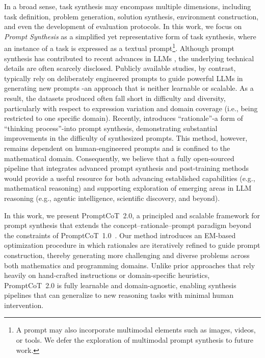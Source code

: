 In a broad sense, task synthesis may encompass multiple dimensions, including task definition, problem generation, solution synthesis, environment construction, and even the development of evaluation protocols. In this work, we focus on \textit{Prompt Synthesis} as a simplified yet representative form of task synthesis, where an instance of a task is expressed as a textual prompt\footnote{A prompt may also incorporate multimodal elements such as images, videos, or tools. We defer the exploration of multimodal prompt synthesis to future work.}. Although prompt synthesis has contributed to recent advances in LLMs \citep{yang2025qwen3,zeng2025glm,moonshot2025kimik2,adler2024nemotron}, the underlying technical details are often scarcely disclosed. Publicly available studies, by contrast, typically rely on deliberately engineered prompts to guide powerful LLMs in generating new prompts \citep{wang2023self,xu2024wizardlm,huang2025key,tang2024mathscale,yue2024mammoth2,li2024numinamath,luo2023wizardcoder,wei2023magicoder,huang2024opencoder,xu2025kodcode,liu2025webexplorer,yang2025swe} -an approach that is neither learnable or scalable. As a result, the datasets produced often fall short in difficulty \citep{zhao2025promptcot} and diversity, particularly with respect to expression variation \citep{xu2024wizardlm} and domain coverage (i.e., being restricted to one specific domain). Recently, \citet{zhao2025promptcot} introduces ``rationale''-a form of ``thinking process''-into prompt synthesis, demonstrating substantial improvements in the difficulty of synthesized prompts. This method, however, remains dependent on human-engineered prompts and is confined to the mathematical domain. Consequently, we believe that a fully open-sourced pipeline that integrates advanced prompt synthesis and post-training methods would provide a useful resource for both advancing established capabilities (e.g., mathematical reasoning) and supporting exploration of emerging areas in LLM reasoning (e.g., agentic intelligence, scientific discovery, and beyond).


In this work, we present PromptCoT~2.0, a principled and scalable framework for prompt synthesis that extends the concept–rationale–prompt paradigm beyond the constraints of PromptCoT~1.0~\citep{zhao2025promptcot}.  
Our method introduces an EM-based optimization procedure in which rationales are iteratively refined to guide prompt construction, thereby generating more challenging and diverse problems across both mathematics and programming domains.  
Unlike prior approaches that rely heavily on hand-crafted instructions or domain-specific heuristics, PromptCoT~2.0 is fully learnable and domain-agnostic, enabling synthesis pipelines that can generalize to new reasoning tasks with minimal human intervention.  


